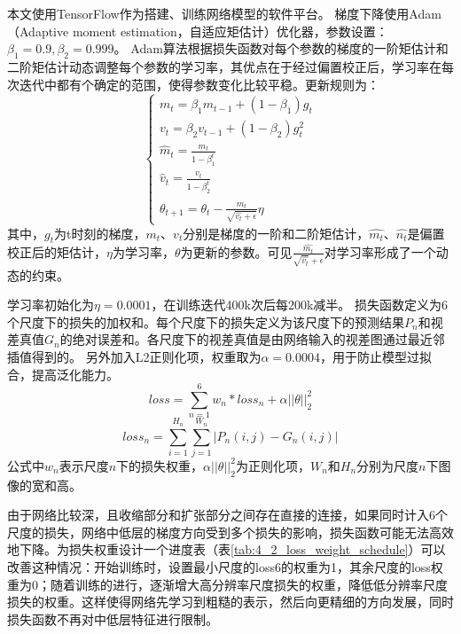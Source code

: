 本文使用TensorFlow\cite{abadi2016tensorflow}作为搭建、训练网络模型的软件平台。
梯度下降使用Adam（Adaptive moment estimation，自适应矩估计）优化器\cite{kingma2014adam}，参数设置：$\beta_1=0.9, \beta_2=0.999$。
Adam算法根据损失函数对每个参数的梯度的一阶矩估计和二阶矩估计动态调整每个参数的学习率，其优点在于经过偏置校正后，学习率在每次迭代中都有个确定的范围，使得参数变化比较平稳。更新规则为：
\begin{equation}\label{eq_4_2_Adam}
\begin{cases}
m_t = \beta_1 m_{t-1} + (1 - \beta_1)g_t \\
v_t = \beta_2 v_{t-1} + (1 - \beta_2) g_t^2 \\
\hat{m}_t = \frac{m_t}{1 - \beta_1^t} \\
\hat{v}_t = \frac{v_t}{1 - \beta_2^{t}} \\
\theta_{t+1} = \theta_t - \frac{\hat{m}_t}{\sqrt{\hat{v_t} + \epsilon}} \eta
\end{cases}
\end{equation}
其中，$g_t$为t时刻的梯度，$m_t$、$v_t$分别是梯度的一阶和二阶矩估计，$\hat{m_t}$、$\hat{n_t}$是偏置校正后的矩估计，$\eta$为学习率，$\theta$为更新的参数。可见$\frac{\hat{m_t}}{\sqrt{\hat{v_t}}+\epsilon}$对学习率形成了一个动态的约束。

学习率初始化为$\eta=0.0001$，在训练迭代400k次后每200k减半。
损失函数定义为6个尺度下的损失的加权和。每个尺度下的损失定义为该尺度下的预测结果$P_n$和视差真值$G_n$的绝对误差和。各尺度下的视差真值是由网络输入的视差图通过最近邻插值得到的。
另外加入L2正则化项，权重取为$\alpha=0.0004$，用于防止模型过拟合，提高泛化能力。
\begin{equation}\label{eq:4_2_loss_all}
loss = \sum_{n=1}^{6}{w_n * loss_n} + \alpha ||\theta||_2^2
\end{equation}
\begin{equation}\label{eq:4_2_loss_single}
loss_n = \sum_{i=1}^{H_n}\sum_{j=1}^{W_n}{|P_n(i, j) - G_n(i, j)|}
\end{equation}
公式中$w_n$表示尺度$n$下的损失权重，$\alpha||\theta||_2^2$为正则化项，$W_n$和$H_n$分别为尺度$n$下图像的宽和高。

由于网络比较深，且收缩部分和扩张部分之间存在直接的连接，如果同时计入6个尺度的损失，网络中低层的梯度方向受到多个损失的影响，损失函数可能无法高效地下降。为损失权重设计一个进度表（表\ref{tab:4_2_loss_weight_schedule}）可以改善这种情况：开始训练时，设置最小尺度的loss6的权重为1，其余尺度的loss权重为0；随着训练的进行，逐渐增大高分辨率尺度损失的权重，降低低分辨率尺度损失的权重。这样使得网络先学习到粗糙的表示，然后向更精细的方向发展，同时损失函数不再对中低层特征进行限制。

